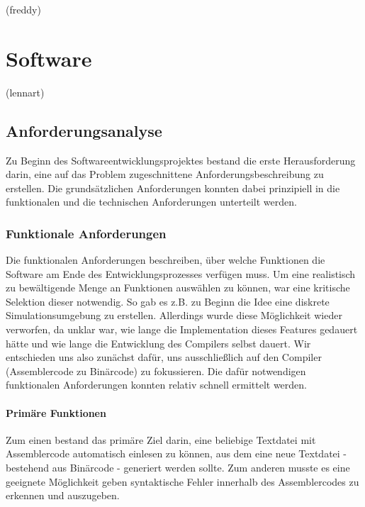 \documentclass[paper=a4,fontsize=12pt,twocolumn]{scrreprt}
\begin{document}
(freddy)

\chapter{Software}

(lennart)

\section{Anforderungsanalyse}
Zu Beginn des Softwareentwicklungsprojektes bestand die erste Herausforderung darin, eine auf das Problem zugeschnittene Anforderungsbeschreibung zu erstellen.
Die grundsätzlichen Anforderungen konnten dabei prinzipiell in die funktionalen und die technischen Anforderungen unterteilt werden. 

\subsection{Funktionale Anforderungen}
Die funktionalen Anforderungen beschreiben, über welche Funktionen die Software am Ende des Entwicklungsprozesses verfügen muss.
Um eine realistisch zu bewältigende Menge an Funktionen auswählen zu können, war eine  kritische Selektion dieser notwendig. 
So gab es z.B. zu Beginn die Idee eine diskrete Simulationsumgebung zu erstellen. Allerdings wurde diese Möglichkeit wieder verworfen, da unklar war, wie lange die Implementation dieses Features gedauert hätte und wie lange die Entwicklung des Compilers selbst dauert.
Wir entschieden uns also zunächst dafür, uns ausschließlich auf den Compiler (Assemblercode zu Binärcode) zu fokussieren.
Die dafür notwendigen funktionalen Anforderungen konnten relativ schnell ermittelt werden.

\subsubsection{Primäre Funktionen}
Zum einen bestand das primäre Ziel darin, eine beliebige Textdatei mit Assemblercode automatisch einlesen zu können, aus dem eine neue Textdatei - bestehend aus Binärcode - generiert werden sollte. Zum anderen musste es eine geeignete Möglichkeit geben syntaktische Fehler innerhalb des Assemblercodes zu erkennen und auszugeben.
\end{document}
